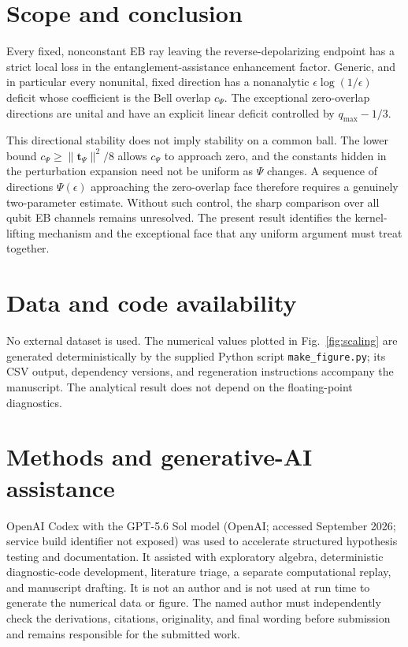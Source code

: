 \documentclass[aip,jmp,reprint,amsmath,amssymb]{revtex4-2}
\newcommand{\eps}{\epsilon}
\begin{document}
\section{Scope and conclusion}
\label{sec:conclusion}

Every fixed, nonconstant EB ray leaving the reverse-depolarizing endpoint has a strict local loss in the entanglement-assistance enhancement factor.  Generic, and in particular every nonunital, fixed direction has a nonanalytic $\eps\log(1/\eps)$ deficit whose coefficient is the Bell overlap $c_\Psi$.  The exceptional zero-overlap directions are unital and have an explicit linear deficit controlled by $q_{\max}-1/3$.

This directional stability does not imply stability on a common ball.  The lower bound $c_\Psi\geq\|\bm t_\Psi\|^2/8$ allows $c_\Psi$ to approach zero, and the constants hidden in the perturbation expansion need not be uniform as $\Psi$ changes.  A sequence of directions $\Psi(\eps)$ approaching the zero-overlap face therefore requires a genuinely two-parameter estimate.  Without such control, the sharp comparison over all qubit EB channels remains unresolved.  The present result identifies the kernel-lifting mechanism and the exceptional face that any uniform argument must treat together.

\section*{Data and code availability}

No external dataset is used.  The numerical values plotted in Fig.~\ref{fig:scaling} are generated deterministically by the supplied Python script \texttt{make\_figure.py}; its CSV output, dependency versions, and regeneration instructions accompany the manuscript.  The analytical result does not depend on the floating-point diagnostics.

\section*{Methods and generative-AI assistance}

OpenAI Codex with the GPT-5.6 Sol model (OpenAI; accessed September 2026; service build identifier not exposed) was used to accelerate structured hypothesis testing and documentation.  It assisted with exploratory algebra, deterministic diagnostic-code development, literature triage, a separate computational replay, and manuscript drafting.  It is not an author and is not used at run time to generate the numerical data or figure.  The named author must independently check the derivations, citations, originality, and final wording before submission and remains responsible for the submitted work.



\end{document}
